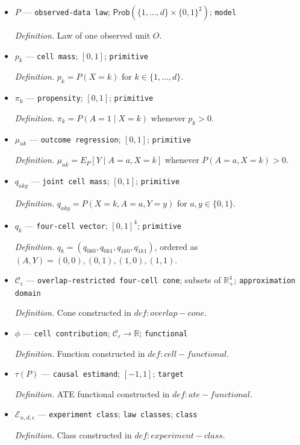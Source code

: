 \documentclass{article}
\begin{document}
\begin{itemize}
  \item \(P\) --- \texttt{observed-data law}; \(\mathsf{Prob}(\{1,\ldots,d\}\times\{0,1\}^2)\); \texttt{model}
  \par\smallskip\noindent\emph{Definition.} Law of one observed unit \(O\).
  \item \(p_k\) --- \texttt{cell mass}; \([0,1]\); \texttt{primitive}
  \par\smallskip\noindent\emph{Definition.} \(p_k=P(X=k)\) for \(k\in\{1,\ldots,d\}\).
  \item \(\pi_k\) --- \texttt{propensity}; \([0,1]\); \texttt{primitive}
  \par\smallskip\noindent\emph{Definition.} \(\pi_k=P(A=1\mid X=k)\) whenever \(p_k>0\).
  \item \(\mu_{ak}\) --- \texttt{outcome regression}; \([0,1]\); \texttt{primitive}
  \par\smallskip\noindent\emph{Definition.} \(\mu_{ak}=E_P[Y\mid A=a,X=k]\) whenever \(P(A=a,X=k)>0\).
  \item \(q_{aky}\) --- \texttt{joint cell mass}; \([0,1]\); \texttt{primitive}
  \par\smallskip\noindent\emph{Definition.} \(q_{aky}=P(X=k,A=a,Y=y)\) for \(a,y\in\{0,1\}\).
  \item \(q_k\) --- \texttt{four-cell vector}; \([0,1]^4\); \texttt{primitive}
  \par\smallskip\noindent\emph{Definition.} \(q_k=(q_{0k0},q_{0k1},q_{1k0},q_{1k1})\), ordered as \((A,Y)=(0,0),(0,1),(1,0),(1,1)\).
  \item \(\mathcal C_\epsilon\) --- \texttt{overlap-restricted four-cell cone}; subsets of \(\mathbb R_+^4\); \texttt{approximation domain}
  \par\smallskip\noindent\emph{Definition.} Cone constructed in \(def:overlap-cone\).
  \item \(\phi\) --- \texttt{cell contribution}; \(\mathcal C_\epsilon\to\mathbb R\); \texttt{functional}
  \par\smallskip\noindent\emph{Definition.} Function constructed in \(def:cell-functional\).
  \item \(\tau(P)\) --- \texttt{causal estimand}; \([-1,1]\); \texttt{target}
  \par\smallskip\noindent\emph{Definition.} ATE functional constructed in \(def:ate-functional\).
  \item \(\mathcal E_{n,d,\epsilon}\) --- \texttt{experiment class}; \texttt{law classes}; \texttt{class}
  \par\smallskip\noindent\emph{Definition.} Class constructed in \(def:experiment-class\).

\end{itemize}
\end{document}

